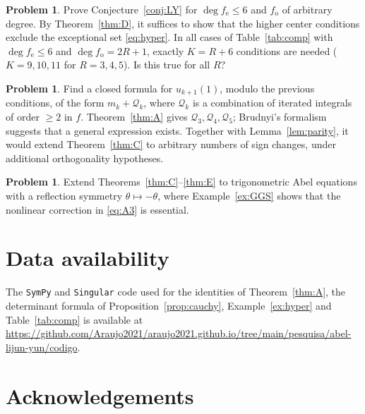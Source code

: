 \documentclass[11pt]{amsart}
\numberwithin{equation}{section}
\theoremstyle{plain}
\theoremstyle{definition}
\newtheorem{problem}[theorem]{Problem}
\theoremstyle{remark}
\newcommand{\fe}{f_{\mathrm e}}
\newcommand{\fo}{f_{\mathrm o}}
\begin{document}
\begin{problem}
Prove Conjecture~\ref{conj:LY} for $\deg\fe\le6$ and $\fo$ of arbitrary degree.
By Theorem~\ref{thm:D}, it suffices to show that the higher center conditions
exclude the exceptional set \eqref{eq:hyper}. In all cases of Table~\ref{tab:comp} with
$\deg\fe\le6$ and $\deg\fo=2R+1$, exactly $K=R+6$ conditions are needed
($K=9,10,11$ for $R=3,4,5$). Is this true for all $R$?
\end{problem}

\begin{problem}
Find a closed formula for $u_{k+1}(1)$, modulo the previous conditions, of the form
$m_k+\mathcal Q_k$, where $\mathcal Q_k$ is a combination of iterated integrals of
order $\ge2$ in $f$. Theorem~\ref{thm:A} gives $\mathcal Q_3,\mathcal Q_4,\mathcal
Q_5$; Brudnyi's formalism \cite{Bru06} suggests that a general expression exists.
Together with Lemma~\ref{lem:parity}, it would extend Theorem~\ref{thm:C} to
arbitrary numbers of sign changes, under additional orthogonality hypotheses.
\end{problem}

\begin{problem}
Extend Theorems~\ref{thm:C}--\ref{thm:E} to trigonometric Abel equations with a
reflection symmetry $\theta\mapsto-\theta$, where Example~\ref{ex:GGS} shows that the
nonlinear correction in \eqref{eq:A3} is essential.
\end{problem}

\section*{Data availability}
The \texttt{SymPy} and \texttt{Singular} code used for the identities of
Theorem~\ref{thm:A}, the determinant formula of Proposition~\ref{prop:cauchy},
Example~\ref{ex:hyper} and Table~\ref{tab:comp} is available at
\url{https://github.com/Araujo2021/araujo2021.github.io/tree/main/pesquisa/abel-lijun-yun/codigo}.

\section*{Acknowledgements}
\end{document}
